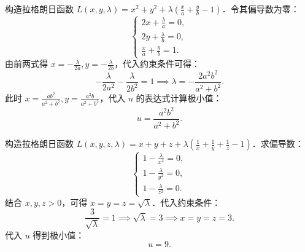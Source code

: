 \begin{solution}

    构造拉格朗日函数 $L(x, y, \lambda) = x^{2} + y^{2} + \lambda \left( \frac{x}{a} + \frac{y}{b} - 1 \right)$．令其偏导数为零：
    \begin{equation}
        \label{eq:p1-lagrange}
        \begin{cases}
            2x + \frac{\lambda}{a} = 0, \\
            2y + \frac{\lambda}{b} = 0, \\
            \frac{x}{a} + \frac{y}{b} = 1.
        \end{cases}
    \end{equation}
    由前两式得 $x = -\frac{\lambda}{2a}, y = -\frac{\lambda}{2b}$，代入约束条件可得：
    \begin{equation}
        -\frac{\lambda}{2 a^{2}} - \frac{\lambda}{2 b^{2}} = 1 \implies \lambda = -\frac{2 a^{2} b^{2}}{a^{2} + b^{2}}.
    \end{equation}
    此时 $x = \frac{a b^{2}}{a^{2} + b^{2}}, y = \frac{a^{2} b}{a^{2} + b^{2}}$，代入 $u$ 的表达式计算极小值：
    \begin{equation}
        \boxed{u = \frac{a^{2} b^{2}}{a^{2} + b^{2}}}.
    \end{equation}


    构造拉格朗日函数 $L(x, y, z, \lambda) = x + y + z + \lambda \left( \frac{1}{x} + \frac{1}{y} + \frac{1}{z} - 1 \right)$．求偏导数：
    \begin{equation}
        \begin{cases}
            1 - \frac{\lambda}{x^{2}} = 0, \\
            1 - \frac{\lambda}{y^{2}} = 0, \\
            1 - \frac{\lambda}{z^{2}} = 0.
        \end{cases}
    \end{equation}
    结合 $x, y, z > 0$，可得 $x = y = z = \sqrt{\lambda}$．代入约束条件：
    \begin{equation}
        \frac{3}{\sqrt{\lambda}} = 1 \implies \sqrt{\lambda} = 3 \implies x = y = z = 3.
    \end{equation}
    代入 $u$ 得到极小值：
    \begin{equation}
        \boxed{u = 9}.
    \end{equation}



\end{solution}
